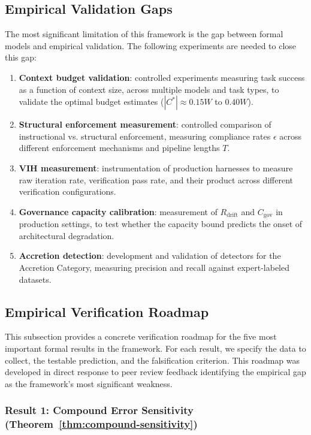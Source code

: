 \subsection{Empirical Validation Gaps}

The most significant limitation of this framework is the gap between formal models and empirical validation. The following experiments are needed to close this gap:

\begin{enumerate}
    \item \textbf{Context budget validation}: controlled experiments measuring task success as a function of context size, across multiple models and task types, to validate the optimal budget estimates ($|C^*| \approx 0.15W$ to $0.40W$).
    \item \textbf{Structural enforcement measurement}: controlled comparison of instructional vs. structural enforcement, measuring compliance rates $\epsilon$ across different enforcement mechanisms and pipeline lengths $T$.
    \item \textbf{VIH measurement}: instrumentation of production harnesses to measure raw iteration rate, verification pass rate, and their product across different verification configurations.
    \item \textbf{Governance capacity calibration}: measurement of $R_{\text{drift}}$ and $C_{\text{gov}}$ in production settings, to test whether the capacity bound predicts the onset of architectural degradation.
    \item \textbf{Accretion detection}: development and validation of detectors for the Accretion Category, measuring precision and recall against expert-labeled datasets.
\end{enumerate}

\subsection{Empirical Verification Roadmap}
\label{sec:verification-roadmap}

This subsection provides a concrete verification roadmap for the five most important formal results in the framework. For each result, we specify the data to collect, the testable prediction, and the falsification criterion. This roadmap was developed in direct response to peer review feedback identifying the empirical gap as the framework's most significant weakness.

\subsubsection{Result 1: Compound Error Sensitivity (Theorem~\ref{thm:compound-sensitivity})}

